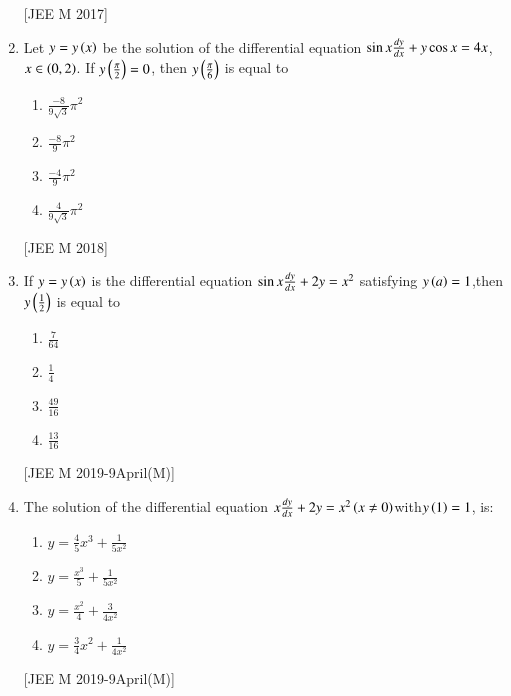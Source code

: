 \documentclass[journal]{IEEEtran}
\begin{document}
\begin{enumerate}
\begin{multicols}{2}
\begin{enumerate}
 \end{enumerate}
\end{multicols}
\hfill
{[JEE M 2017]}


\item Let $ y=y\left(x\right)$ be the solution of the differential equation $\sin{x}\frac{d{y}}{d{x}}+y\cos{x}=4x$, $x\in\left(0,2\right)$. If $y\left(\frac{\pi}{2}\right)=0$, then $y\left(\frac{\pi}{6}\right)$ is equal to
\begin{multicols}{2}
 \begin{enumerate}
    \item $ \frac{-8}{9\sqrt{3}}\pi^2$
    \item $ \frac{-8}{9}\pi^2$
    \item $\frac{-4}{9}\pi^2$
    \item $ \frac{4}{9\sqrt{3}}\pi^2 $
 \end{enumerate}
\end{multicols}
\hfill
{[JEE M 2018]}
\item If $ y=y\left(x\right)$ is the differential equation $ \sin{x}\frac{d{y}}{d{x}}+2y=x^2$ satisfying $y\left(a\right)=1$,then $y\left(\frac{1}{2}\right)$ is equal to
\begin{multicols}{2}
 \begin{enumerate}
    \item $ \frac{7}{64}$

    
    \item $ \frac{1}{4}$

    
    \item $ \frac{49}{16}$
    
    \item $ \frac{13}{16}$
    
    
 \end{enumerate}
\end{multicols}
\hfill
{[JEE M 2019-9April(M)]}
\item The solution of the differential equation $ x\frac{d{y}}{d{x}}+2y=x^2 \left(x\neq0\right)$with$ y\left(1\right)=1$, is:
\begin{multicols}{2}
 \begin{enumerate}
    \item $ y=\frac{4}{5}x^3+\frac{1}{5x^2}$

    \item $ y=\frac{x^3}{5}+\frac{1}{5x^2}$
    \item $ y=\frac{x^2}{4}+\frac{3}{4x^2}$
    \item $ y=\frac{3}{4}x^2+\frac{1}{4x^2}$
  \end{enumerate}
\end{multicols}
\hfill
{[JEE M 2019-9April(M)]}


\end{enumerate}
\end{document}
